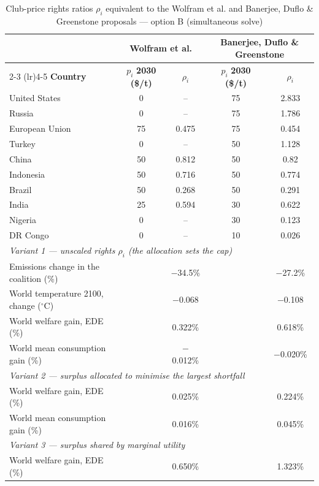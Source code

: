 \begin{table}[htbp]
\centering
\small
\caption{Club-price rights ratios $\rho_i$ equivalent to the Wolfram et al. and Banerjee, Duflo \& Greenstone proposals --- option B (simultaneous solve)}
\renewcommand{\arraystretch}{1.15}
\begin{tabular}{lcccc}
  \toprule
  & \multicolumn{2}{c}{\textbf{Wolfram et al.}} & \multicolumn{2}{c}{\textbf{Banerjee, Duflo \& Greenstone}} \\
  \cmidrule(lr){2-3} \cmidrule(lr){4-5}
  \textbf{Country} & $p_i$ \textbf{2030 (\$/t)} & $\rho_i$ & $p_i$ \textbf{2030 (\$/t)} & $\rho_i$ \\
  \midrule
  United States & 0 & -- & 75 & 2.833 \\
  Russia & 0 & -- & 75 & 1.786 \\
  European Union & 75 & 0.475 & 75 & 0.454 \\
  Turkey & 0 & -- & 50 & 1.128 \\
  China & 50 & 0.812 & 50 & 0.82 \\
  Indonesia & 50 & 0.716 & 50 & 0.774 \\
  Brazil & 50 & 0.268 & 50 & 0.291 \\
  India & 25 & 0.594 & 30 & 0.622 \\
  Nigeria & 0 & -- & 30 & 0.123 \\
  DR Congo & 0 & -- & 10 & 0.026 \\
  \midrule
  \multicolumn{5}{l}{\textit{Variant 1 --- unscaled rights $\rho_i$ (the allocation sets the cap)}} \\
  \quad Emissions change in the coalition (\%) &  & $-$34.5\% &  & $-$27.2\% \\
  \quad World temperature 2100, change ($^\circ$C) &  & $-$0.068 &  & $-$0.108 \\
  \quad World welfare gain, EDE (\%) &  & 0.322\% &  & 0.618\% \\
  \quad World mean consumption gain (\%) &  & $-$0.012\% &  & $-$0.020\% \\
  \midrule
  \multicolumn{5}{l}{\textit{Variant 2 --- surplus allocated to minimise the largest shortfall}} \\
  \quad World welfare gain, EDE (\%) &  & 0.025\% &  & 0.224\% \\
  \quad World mean consumption gain (\%) &  & 0.016\% &  & 0.045\% \\
  \midrule
  \multicolumn{5}{l}{\textit{Variant 3 --- surplus shared by marginal utility}} \\
  \quad World welfare gain, EDE (\%) &  & 0.650\% &  & 1.323\% \\

\end{tabular}
\end{table}
